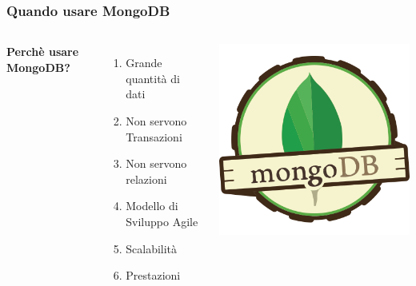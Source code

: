 \documentclass{beamer}
\begin{document}
\begin{frame}
\frametitle{Quando usare MongoDB}
\begin{columns}[c] %

\textbf{Perchè usare MongoDB?}
\begin{enumerate}
\item Grande quantità di dati
\item Non servono Transazioni
\item Non servono relazioni
\item Modello di Sviluppo Agile
\item Scalabilità
\item Prestazioni
\end{enumerate}

\includegraphics[width=1.2\linewidth]{mongodb.png}

\end{columns}
\end{frame}


\end{document}
